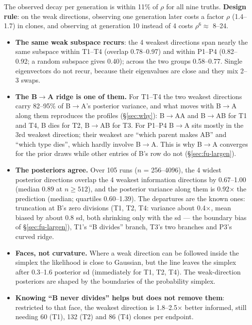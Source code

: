 \documentclass[10pt,a4paper]{article}
\newcommand{\BA}{B$\to$A}
\begin{document}
The observed decay per generation is within 11\% of $\rho$ for all nine truths. \textbf{Design rule}: on the weak directions, observing one generation later costs a factor $\rho$ (1.4--1.7) in clones, and observing at generation 10 instead of 4 costs $\rho^6 \approx$ 8--24.

\begin{itemize}
\item \textbf{The same weak subspace recurs}: the 4 weakest directions span nearly the same subspace within T1--T4 (overlap 0.78--0.97) and within P1--P4 (0.82--0.92; a random subspace gives 0.40); across the two groups 0.58--0.77. Single eigenvectors do not recur, because their eigenvalues are close and they mix 2--3 swaps.
\item \textbf{The \BA{} ridge is one of them.} For T1--T4 the two weakest directions carry 82--95\% of \BA{}'s posterior variance, and what moves with \BA{} along them reproduces the profiles (\S\ref{sec:why}): B$\to$AA and B$\to$AB for T1 and T4, B dies for T2, B$\to$AB for T3. For P1--P4 \BA{} sits mostly in the 3rd weakest direction; their weakest are ``which parent makes AB'' and ``which type dies'', which hardly involve \BA. This is why \BA{} converges for the prior draws while other entries of B's row do not (\S\ref{sec:fu-largen}).
\item \textbf{The posteriors agree.} Over 105 runs ($n$ = 256--4096), the 4 widest posterior directions overlap the 4 weakest information directions by 0.67--1.00 (median 0.89 at $n \ge 512$), and the posterior variance along them is 0.92$\times$ the prediction (median; quartiles 0.60--1.39). The departures are the known ones: truncation at B's zero divisions (T1, T2, T4: variance about 0.4$\times$, mean biased by about 0.8 sd, both shrinking only with the sd --- the boundary bias of \S\ref{sec:fu-largen}), T1's ``B divides'' branch, T3's two branches and P3's curved ridge.
\item \textbf{Faces, not curvature.} Where a weak direction can be followed inside the simplex the likelihood is close to Gaussian, but the line leaves the simplex after 0.3--1.6 posterior sd (immediately for T1, T2, T4). The weak-direction posteriors are shaped by the boundaries of the probability simplex.
\item \textbf{Knowing ``B never divides'' helps but does not remove them}: restricted to that face, the weakest direction is 1.8--2.5$\times$ better informed, still needing 60 (T1), 132 (T2) and 86 (T4) clones per endpoint.
\end{itemize}
\end{document}

